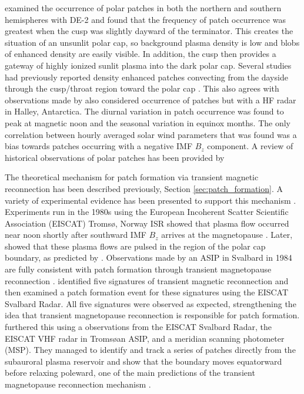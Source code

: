 \citet{Coley1998} examined the occurrence of polar patches in both the northern and southern hemispheres with DE-2 and found that the frequency of patch occurrence was greatest when  the cusp was slightly dayward of the terminator.  This creates the situation of an unsunlit polar cap, so background plasma density is low and blobs of enhanced density are easily visible.  In addition, the cusp then provides a gateway of highly ionized sunlit plasma into the dark polar cap.  Several studies had previously reported density enhanced patches convecting from the dayside through the cusp/throat region toward the polar cap \citep{Kelly1984,Foster1984,Foster1985,Foster1993}.  This also agrees with observations made by \citet{Sojka1982,delaBeaujardiere1985}  \citet{Rodger1996} also considered occurrence of patches but with a HF radar in Halley, Antarctica.  The diurnal variation in patch occurrence was found to peak at magnetic noon and the seasonal variation in equinox months.  The only correlation between hourly averaged solar wind parameters that was found was a bias towards patches occurring with a negative IMF \(B_z\) component.  A review of historical observations of polar patches has been provided by \citet{Crowley1996}

The theoretical mechanism for patch formation via transient magnetic reconnection has been described previously, Section \ref{sec:patch_formation}.  A variety of experimental evidence has been presented to support this mechanism \citep{Cowley1998,Carlson2002}.  Experiments run in the 1980s using the European Incoherent Scatter Scientific Association (EISCAT) Troms\o, Norway ISR showed that plasma flow occurred near noon shortly after southward IMF \(B_z\) arrives at the magnetopause \citep{Etemadi1988,Todd1988}.  Later, \citet{Lockwood1993a,Lockwood1993b} showed that these plasma flows are pulsed in the region of the polar cap boundary, as predicted by \citet{Cowley1991}.  Observations made by an ASIP in Svalbard in 1984 are fully consistent with patch formation through transient magnetopause reconnection \citep{Carlson1996,Carlson2002}.  \citet{Carlson2004} identified five signatures of transient magnetic reconnection and then examined a patch formation event for these signatures using the EISCAT Svalbard Radar.  All five signatures were observed as expected, strengthening the idea that transient magnetopause reconnection is responsible for patch formation.  \citet{Carlson2006} furthered this using a observations from the EISCAT Svalbard Radar, the EISCAT VHF radar in Troms\o an ASIP, and a meridian scanning photometer (MSP).  They managed to identify and track a series of patches directly from the subauroral plasma reservoir and show that the boundary moves equatorward before relaxing poleward, one of the main predictions of the transient magnetopause reconnection mechanism \citep{Lockwood1992b}.

